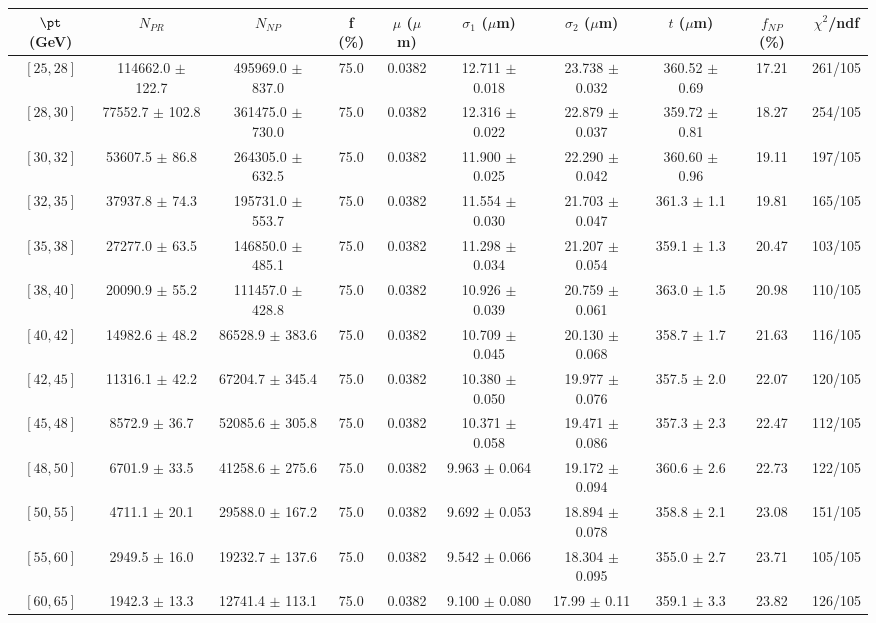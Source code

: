 \begin{tabular}{c||c|c|c|c|c|c|c||c|c}
$\pt$ (GeV) & $N_{PR}$ & $N_{NP}$ & f (\%) & $\mu$ ($\mu$m) & $\sigma_1$ ($\mu$m) & $\sigma_2$ ($\mu$m)  & $t$ ($\mu$m) & $f_{NP}$ (\%) & $\chi^2$/ndf \\
\hline
$[25, 28]$ & 114662.0 $\pm$ 122.7 & 495969.0 $\pm$ 837.0 & 75.0 & 0.0382 & 12.711 $\pm$ 0.018 & 23.738 $\pm$ 0.032 & 360.52 $\pm$ 0.69 & 17.21 & 261/105\\
$[28, 30]$ & 77552.7 $\pm$ 102.8 & 361475.0 $\pm$ 730.0 & 75.0 & 0.0382 & 12.316 $\pm$ 0.022 & 22.879 $\pm$ 0.037 & 359.72 $\pm$ 0.81 & 18.27 & 254/105\\
$[30, 32]$ & 53607.5 $\pm$ 86.8 & 264305.0 $\pm$ 632.5 & 75.0 & 0.0382 & 11.900 $\pm$ 0.025 & 22.290 $\pm$ 0.042 & 360.60 $\pm$ 0.96 & 19.11 & 197/105\\
$[32, 35]$ & 37937.8 $\pm$ 74.3 & 195731.0 $\pm$ 553.7 & 75.0 & 0.0382 & 11.554 $\pm$ 0.030 & 21.703 $\pm$ 0.047 & 361.3 $\pm$ 1.1 & 19.81 & 165/105\\
$[35, 38]$ & 27277.0 $\pm$ 63.5 & 146850.0 $\pm$ 485.1 & 75.0 & 0.0382 & 11.298 $\pm$ 0.034 & 21.207 $\pm$ 0.054 & 359.1 $\pm$ 1.3 & 20.47 & 103/105\\
$[38, 40]$ & 20090.9 $\pm$ 55.2 & 111457.0 $\pm$ 428.8 & 75.0 & 0.0382 & 10.926 $\pm$ 0.039 & 20.759 $\pm$ 0.061 & 363.0 $\pm$ 1.5 & 20.98 & 110/105\\
$[40, 42]$ & 14982.6 $\pm$ 48.2 & 86528.9 $\pm$ 383.6 & 75.0 & 0.0382 & 10.709 $\pm$ 0.045 & 20.130 $\pm$ 0.068 & 358.7 $\pm$ 1.7 & 21.63 & 116/105\\
$[42, 45]$ & 11316.1 $\pm$ 42.2 & 67204.7 $\pm$ 345.4 & 75.0 & 0.0382 & 10.380 $\pm$ 0.050 & 19.977 $\pm$ 0.076 & 357.5 $\pm$ 2.0 & 22.07 & 120/105\\
$[45, 48]$ & 8572.9 $\pm$ 36.7 & 52085.6 $\pm$ 305.8 & 75.0 & 0.0382 & 10.371 $\pm$ 0.058 & 19.471 $\pm$ 0.086 & 357.3 $\pm$ 2.3 & 22.47 & 112/105\\
$[48, 50]$ & 6701.9 $\pm$ 33.5 & 41258.6 $\pm$ 275.6 & 75.0 & 0.0382 & 9.963 $\pm$ 0.064 & 19.172 $\pm$ 0.094 & 360.6 $\pm$ 2.6 & 22.73 & 122/105\\
$[50, 55]$ & 4711.1 $\pm$ 20.1 & 29588.0 $\pm$ 167.2 & 75.0 & 0.0382 & 9.692 $\pm$ 0.053 & 18.894 $\pm$ 0.078 & 358.8 $\pm$ 2.1 & 23.08 & 151/105\\
$[55, 60]$ & 2949.5 $\pm$ 16.0 & 19232.7 $\pm$ 137.6 & 75.0 & 0.0382 & 9.542 $\pm$ 0.066 & 18.304 $\pm$ 0.095 & 355.0 $\pm$ 2.7 & 23.71 & 105/105\\
$[60, 65]$ & 1942.3 $\pm$ 13.3 & 12741.4 $\pm$ 113.1 & 75.0 & 0.0382 & 9.100 $\pm$ 0.080 & 17.99 $\pm$ 0.11 & 359.1 $\pm$ 3.3 & 23.82 & 126/105\\

\end{tabular}
